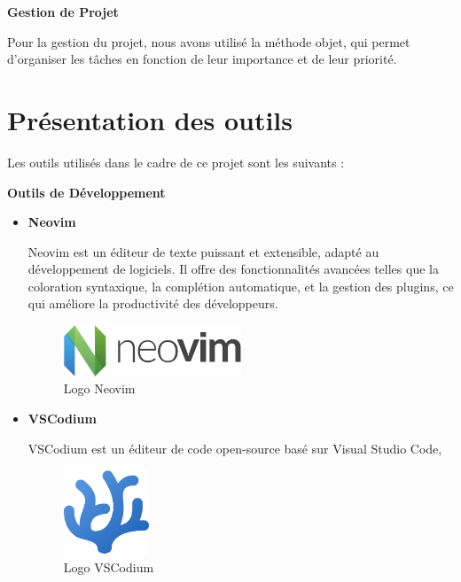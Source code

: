 \textbf{Gestion de Projet}

Pour la gestion du projet, nous avons utilisé la méthode objet, qui permet
d'organiser les tâches en fonction de leur importance et de leur priorité.


\section{Présentation des outils}
Les outils utilisés dans le cadre de ce projet sont les suivants :

\textbf{Outils de Développement}
\begin{itemize}
  \item \textbf{Neovim}

    Neovim est un éditeur de texte puissant et extensible, adapté au
    développement de logiciels. Il offre des fonctionnalités avancées telles
    que la coloration syntaxique, la complétion automatique, et la gestion
    des plugins, ce qui améliore la productivité des développeurs.

    \begin{figure}[H]
      \centering
      \includegraphics[width=0.5\textwidth]{images/Neovim-logo.png}
      \caption{Logo Neovim}
    \end{figure}

  \item \textbf{VSCodium}

    VSCodium est un éditeur de code open-source basé sur Visual Studio Code,
    \begin{figure}[H]
      \centering
      \includegraphics[width=1.0in, height=1.0in]{images/codium_cnl.png}
      \caption{Logo VSCodium}
    \end{figure}
\end{itemize}

